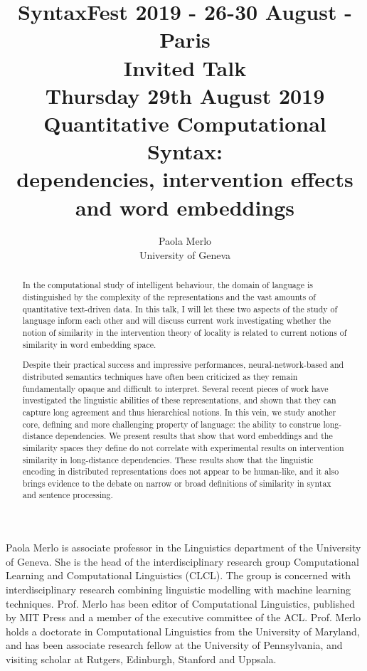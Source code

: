 \documentclass[11pt]{article}
\title{{\footnotesize SyntaxFest 2019 - 26-30 August - Paris}\\
\vspace{10mm}
 Invited Talk\\
  {\small Thursday 29th August 2019}\\
  Quantitative Computational Syntax:\\ dependencies, intervention effects and word embeddings}
\author{Paola Merlo\\
  University of Geneva}
\begin{document}
\maketitle
\begin{abstract}
In the  computational study  of intelligent  behaviour, the  domain of
language is distinguished by the complexity of the representations and
the vast amounts  of quantitative text-driven  data. In this talk,  I will
let these two  aspects of the study of language  inform each other and
will  discuss  current  work   investigating  whether  the  notion  of
similarity  in  the intervention  theory  of  locality is  related  to
current notions of similarity in word embedding space.

Despite   their  practical   success   and  impressive   performances,
neural-network-based and  distributed semantics techniques  have often
been criticized as  they remain fundamentally opaque  and difficult to
interpret.   Several  recent  pieces  of work  have  investigated  the
linguistic abilities of these representations, and shown that they can
capture long agreement  and thus hierarchical notions.   In this vein,
we  study another  core,  defining and  more  challenging property  of
language:  the ability  to  construe  long-distance dependencies.   We
present  results that  show that  word embeddings  and the  similarity
spaces  they define  do  not correlate  with  experimental results  on
intervention similarity  in long-distance dependencies.  These results
show that the linguistic  encoding in distributed representations does
not appear to be human-like, and it also brings evidence to the debate
on narrow  or broad definitions  of similarity in syntax  and sentence
      processing.
\end{abstract}

\vspace{4mm}
\begin{shortbio}
  Paola Merlo  is associate professor  in the Linguistics  department of
the University  of Geneva.  She  is the head of  the interdisciplinary
research  group Computational  Learning and  Computational Linguistics
(CLCL).   The  group  is  concerned  with  interdisciplinary  research
combining  linguistic  modelling  with  machine  learning  techniques.
Prof.  Merlo  has been editor of  Computational Linguistics, published
by  MIT  Press  and  a  member  of  the  executive  committee  of  the
ACL. Prof. Merlo holds a  doctorate in  Computational Linguistics  from the
University of Maryland,  and  has been  associate research fellow
at the  University of Pennsylvania,  and visiting scholar  at Rutgers,
Edinburgh, Stanford and Uppsala.
\end{shortbio}
\end{document}
